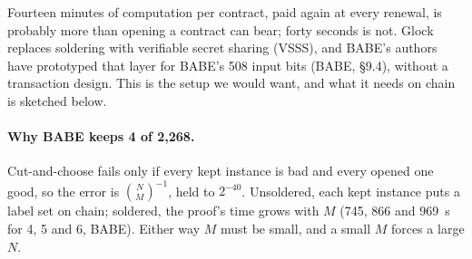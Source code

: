 \documentclass[11pt]{article}
\begin{document}
Fourteen minutes of computation per contract, paid again at every
renewal, is probably more than opening a contract can bear; forty
seconds is not. Glock~\cite{glock} replaces soldering with verifiable
secret sharing (VSSS), and BABE's authors have prototyped that layer for
BABE's 508 input bits (BABE, §9.4), without a transaction design. This
is the setup we would want, and what it needs on chain is sketched
below.

\paragraph{Why BABE keeps 4 of 2,268.} Cut-and-choose fails only if
every kept instance is bad and every opened one good, so the error is
$\binom{N}{M}^{-1}$, held to $2^{-40}$. Unsoldered, each kept instance
puts a label set on chain; soldered, the proof's time grows with $M$
(745, 866 and 969~s for 4, 5 and 6, BABE). Either way $M$ must be small,
and a small $M$ forces a large $N$.
\end{document}
